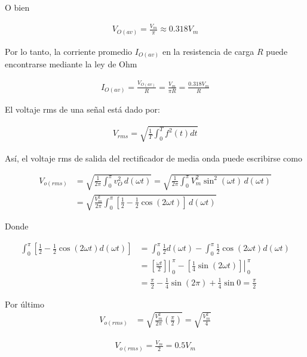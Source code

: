 \documentclass{article}
\begin{document}
O bien

\begin{align}
	V_{O(av)} = \frac{V_m}{\pi} \approx 0.318V_m
\end{align}

Por lo tanto, la corriente promedio $I_{O(av)}$ en la resistencia de carga $R$ puede encontrarse mediante la ley de Ohm

\begin{align}
	I_{O(av)} = \frac{V_{O(av)}}{R} = \frac{V_m}{\pi R} = \frac{0.318V_m}{R}
\end{align}

El voltaje rms de una señal está dado por:

\begin{align}
	V_{rms} = \sqrt{\frac{1}{T} \int_{0}^{T} {f^2 (t) dt}}
\end{align}

Así, el voltaje rms de salida del rectificador de media onda puede escribirse como

\begin{align}
	V_{o(rms)} &= \sqrt{\frac{1}{2\pi} \int_{0}^{\pi} v_O^2 \, d(\omega t)} = \sqrt{\frac{1}{2\pi} \int_{0}^{\pi} V_m^2 \sin^2(\omega t) \, d(\omega t)} \nonumber \\
	&= \sqrt{\frac{V_m^2}{2\pi} \int_{0}^{\pi} \left[\frac{1}{2} - \frac{1}{2} \cos(2 \omega t)\right] \, d(\omega t)} \nonumber
\end{align}

Donde

\begin{align}
	\int_{0}^{\pi} \left[\frac{1}{2} - \frac{1}{2} \cos (2\omega t) d(\omega t) \right] &= \int_{0}^{\pi} \frac{1}{2} d(\omega t) - \int_{0}^{\pi} \frac{1}{2} \cos (2\omega t) d(\omega t) \nonumber \\
	&= \left.{\left[ \frac{\omega t}{2} \right]}\right|_{\;0}^{\;\pi} - \left.{\left[ \frac{1}{4} \sin (2\omega t) \right]}\right|_{\;0}^{\;\pi} \nonumber \\
	&= \frac{\pi}{2} - \frac{1}{4} \sin (2\pi) + \frac{1}{4} \sin 0 = \frac{\pi}{2} \nonumber
\end{align}

Por último
\begin{align}
	V_{o(rms)} &= \sqrt{ \frac{V_m^2}{2\pi} \left( \frac{\pi}{2} \right) } = \sqrt{ \frac{V_m^2}{4}  } \nonumber
\end{align}

\begin{align}
	V_{o(rms)} = \frac{V_m}{2} = 0.5V_m
\end{align}
\end{document}
